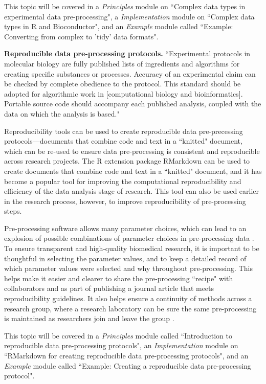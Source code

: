 \documentclass[pdftex,english,11pt,parskip=half]{scrartcl}
\begin{document}
This topic will be covered in a \textit{Principles} module on ``Complex data types in
experimental data pre-processing", a \textit{Implementation} module on ``Complex
data types in R and Bioconductor", and an \textit{Example} module called
``Example: Converting from complex to 'tidy' data formats".

\textbf{Reproducible data pre-processing protocols.} ``Experimental protocols in molecular biology are fully published lists of ingredients and algorithms for creating specific substances or processes. Accuracy of an experimental claim can be checked by complete obedience to the protocol. This standard should be adopted for algorithmic work in [computational biology and bioinformatics]. Portable source code should accompany each published analysis, coupled with the data on which the analysis is based." \cite{gentleman2004bioconductor}

Reproducibility tools can be used to create reproducible data pre-precessing protocols---documents that combine code and text in a ``knitted" document, which can be re-used to ensure data pre-processing is consistent and reproducible across research projects. The R extension package RMarkdown can be used to create documents that combine code and text in a 
``knitted" document, and it has become a popular tool 
for improving the computational reproducibility and 
efficiency of the data analysis stage of research. This tool can also be used earlier in the research process, however, to improve reproducibility of pre-processing steps. 

Pre-processing software allows many parameter choices, which can lead to an explosion of possible combinations of parameter choices in pre-processing data \cite{munafo2017manifesto, shade2015computing, pernet2015improving}. To ensure transparent and high-quality biomedical research, it is important to be thoughtful in selecting the parameter values, and to keep a detailed record of which parameter values were selected and why throughout pre-processing. This helps make it easier and clearer to share the pre-processing ``recipe" with collaborators and as part of publishing a journal article that meets reproducibility guidelines. It also helps ensure a continuity of methods across a research group, where a research laboratory can be sure the same pre-processing is maintained as researchers join and leave the group \cite{shade2015computing}.

This topic will be covered in a \textit{Principles} module called ``Introduction to reproducible data pre-processing protocols", an \textit{Implementation} module on ``RMarkdown
for creating reproducible data pre-processing protocols", and an
\textit{Example} module called ``Example: Creating a reproducible data
pre-processing protocol". 
\end{document}
